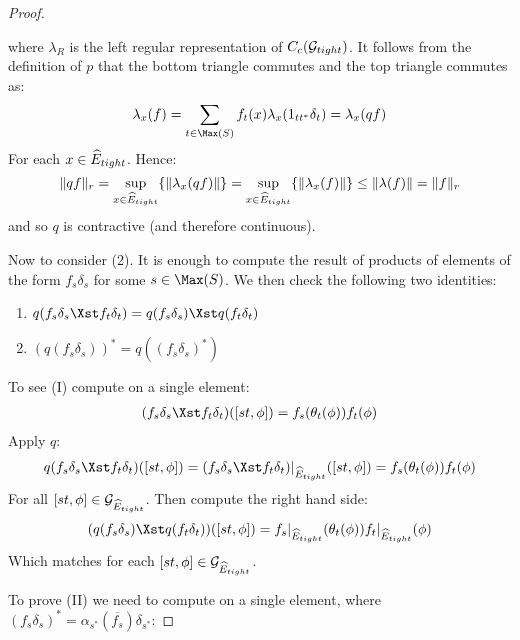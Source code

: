 \begin{corollary}
\begin{proof}
\begin{center}
\begin{tikzpicture}
\end{tikzpicture}
\end{center}

where $\lambda_{R}$ is the left regular representation of $C_{c}(\G_{tight})$. It follows from the definition of $p$ that the bottom triangle commutes and the top triangle commutes as:
\begin{equation*}
\lambda_{x}(f) =\sum_{t \in \Max(S)} f_{t}(x)\lambda_{x}(1_{tt^{*}}\delta_{t}) = \lambda_{x}(qf)
\end{equation*}
For each $x \in \E_{tight}$. Hence:
\begin{equation*}
\Vert qf \Vert_{r} = \sup_{x \in \E_{tight}} \lbrace \Vert \lambda_{x}(qf) \Vert \rbrace = \sup_{x \in \E_{tight}} \lbrace \Vert \lambda_{x}(f) \Vert \rbrace \leq \Vert \lambda(f) \Vert = \Vert f \Vert_{r}
\end{equation*}
and so $q$ is contractive (and therefore continuous).
 
Now to consider (2). It is enough to compute the result of products of elements of the form $f_{s}\delta_{s}$ for some $s \in \Max(S)$. We then check the following two identities:


\begin{enumerate}[I]
\item $q(f_{s}\delta_{s} \Xst f_{t}\delta_{t}) = q(f_{s}\delta_{s})\Xst q(f_{t}\delta_{t})$
\item $(q(f_{s}\delta_{s}))^{*}=q((f_{s}\delta_{s})^{*})$
\end{enumerate}


To see (I) compute on a single element:
\begin{eqnarray*}
(f_{s}\delta_{s} \Xst f_{t}\delta_{t})([st,\phi])=f_{s}(\theta_{t}(\phi))f_{t}(\phi)
\end{eqnarray*}
Apply $q$:
\begin{eqnarray*}
q(f_{s}\delta_{s} \Xst f_{t}\delta_{t})([st,\phi])= (f_{s}\delta_{s} \Xst f_{t}\delta_{t})|_{\E_{tight}}([st,\phi]) =f_{s}(\theta_{t}(\phi))f_{t}(\phi)
\end{eqnarray*}
For all $[st,\phi] \in \G_{\E_{tight}}$. Then compute the right hand side: 
\begin{eqnarray*}
(q(f_{s}\delta_{s}) \Xst q(f_{t}\delta_{t}))([st,\phi])=f_{s}|_{\E_{tight}}(\theta_{t}(\phi))f_{t}|_{\E_{tight}}(\phi)
\end{eqnarray*}
Which matches for each $[st,\phi] \in \G_{\E_{tight}}$. 

To prove (II) we need to compute on a single element, where $(f_{s}\delta_{s})^{*}=\alpha_{s^{*}}(\overline{f_{s}})\delta_{s^{*}}$:


\end{proof}
\end{corollary}

